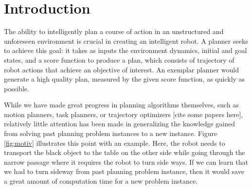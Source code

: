 \section{Introduction}

The ability to intelligently plan a course of action in an unstructured
and unforeseen environment is crucial in creating an intelligent robot.
A planner seeks to achieve this goal: it takes as inputs the 
environment dynamics, initial and goal states, 
and a score function to produce a plan, which consists of trajectory of
robot actions that achieve an objective of interest. An exemplar planner 
would generate a  high quality plan, measured by the given score function, as 
quickly as possible.


While we have made great progress in  planning algorithms 
themselves, such as motion planners, 
task planners, or trajectory optimizers [cite some papers here], 
relatively little attention has been made in generalizing 
the knowledge gained from solving past planning problem instances
to a new instance. Figure \ref{fig:motiv} illustrates
this point with an example. Here, the robot needs to transport
the black object to the table on the other side
while going through the narrow passage where 
it requires the robot to turn side ways. If we can learn that 
we had to turn sideway from past planning problem instance,
then it would save a great amount of computation time for
a new problem instance.

